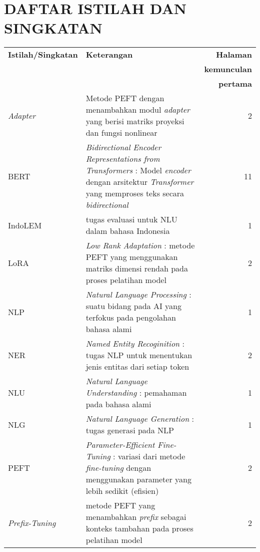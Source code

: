 \clearpage
\chapter*{DAFTAR ISTILAH DAN SINGKATAN}
\begin{center}
   \begin{table}[h]
        \renewcommand{\arraystretch}{1.5}
        \begin{tabularx}{\textwidth}{lXr}
            \textbf{Istilah/Singkatan} & \textbf{Keterangan} & \textbf{Halaman} \\
                                       & & \textbf{kemunculan} \\
                                       & & \textbf{pertama} \\
            \textit{Adapter} & Metode PEFT dengan menambahkan modul \textit{adapter} yang berisi matriks proyeksi dan fungsi nonlinear & 2 \\
            BERT & \textit{Bidirectional Encoder Representations from Transformers} : Model \textit{encoder} dengan arsitektur \textit{Transformer} yang memproses teks secara \textit{bidirectional} & 11 \\
            IndoLEM & tugas evaluasi untuk NLU dalam bahasa Indonesia & 1 \\
            LoRA & \textit{Low Rank Adaptation} : metode PEFT yang menggunakan matriks dimensi rendah pada proses pelatihan model & 2 \\
            NLP & \textit{Natural Language Processing} : suatu bidang pada AI yang terfokus pada pengolahan bahasa alami & 1 \\
            NER & \textit{Named Entity Recoginition} : tugas NLP untuk menentukan jenis entitas dari setiap token & 2 \\
            NLU & \textit{Natural Language Understanding} : pemahaman pada bahasa alami & 1 \\
            NLG & \textit{Natural Language Generation} : tugas generasi pada NLP & 1 \\
            PEFT & \textit{Parameter-Efficient Fine-Tuning} : variasi dari metode \textit{fine-tuning} dengan menggunakan parameter yang lebih sedikit (efisien) & 2 \\
            \textit{Prefix-Tuning} & metode PEFT yang menambahkan \textit{prefix} sebagai konteks tambahan pada proses pelatihan model & 2 \\
        \end{tabularx}
    \end{table}
\end{center}
